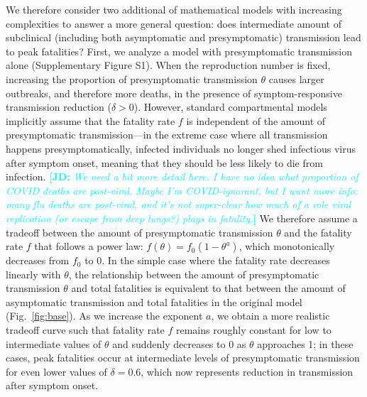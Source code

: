 \documentclass[12pt]{article}
\newcommand{\comment}{\showcomment}
\newcommand{\showcomment}[3]{\textcolor{#1}{\textbf{[#2: }\textsl{#3}\textbf{]}}}
\newcommand{\jd}[1]{\comment{cyan}{JD}{#1}}
\newcommand{\fref}[1]{Fig.~\ref{fig:#1}}
\begin{document}
We therefore consider two additional of mathematical models with increasing complexities to answer a more general question:
does intermediate amount of subclinical (including both asymptomatic and presymptomatic) transmission lead to peak fatalities?
First, we analyze a model with presymptomatic transmission alone (Supplementary Figure S1).
When the reproduction number is fixed, increasing the proportion of presymptomatic transmission $\theta$ causes larger outbreaks, and therefore more deaths, in the presence of symptom-responsive transmission reduction ($\delta > 0$).
However, standard compartmental models implicitly assume that the fatality rate $f$ is independent of the amount of presymptomatic transmission---in the extreme case where all transmission happens presymptomatically, infected individuals no longer shed infectious virus after symptom onset, meaning that they should be less likely to die from infection.
\jd{We need a bit more detail here. I have no idea what proportion of COVID deaths are post-viral. Maybe I'm COVID-ignorant, but I want more info: many flu deaths are post-viral, and it's not super-clear how much of a role viral replication (or escape from deep lungs?) plays in fatality.}
We therefore assume a tradeoff between the amount of presymptomatic transmission $\theta$ and the fatality rate $f$ that follows a power law: $f(\theta) = f_0 (1-\theta^a)$, which monotonically decreases from $f_0$ to 0.
In the simple case where the fatality rate decreases linearly with $\theta$, the relationship between the amount of presymptomatic transmission $\theta$ and total fatalities is equivalent to that between the amount of asymptomatic transmission and total fatalities in the original model (\fref{base}).
As we increase the exponent $a$, we obtain a more realistic tradeoff curve such that fatality rate $f$ remains roughly constant for low to intermediate values of $\theta$ and suddenly decreases to $0$ as $\theta$ approaches 1;
in these cases, peak fatalities occur at intermediate levels of presymptomatic transmission for even lower values of $\delta=0.6$, which now represents reduction in transmission after symptom onset.
\end{document}
